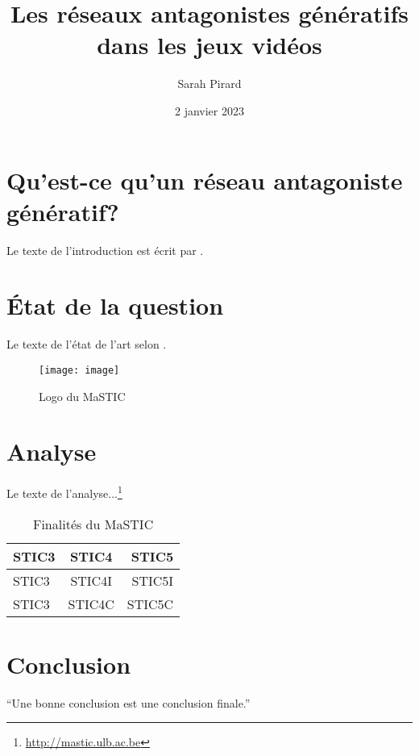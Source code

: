 \documentclass[a4paper,11pt]{article} %
\title{Les réseaux antagonistes génératifs dans les jeux vidéos} %
\author{Sarah Pirard} %
\date{2 janvier 2023} %
\begin{document}
\maketitle %

\section{Qu'est-ce qu'un réseau antagoniste génératif?} %
Le texte de l'introduction est écrit par \citet{Boy99}. %

\section{État de la question} %
Le texte de l'état de l'art selon \citet[p. 123]{Boy11}. %

\begin{figure}[h] %
  \centering %
  \texttt{[image: image]} %
  \caption{Logo du MaSTIC} %
\end{figure}

\section{Analyse} %
Le texte de l'analyse...\footnote{\url{http://mastic.ulb.ac.be}}

\begin{table}[h] %
  \centering %
  \begin{tabular}{|l|c|r|} %
    \hline %
    STIC3 & STIC4 & STIC5 \\ %
    \hline
    STIC3 & STIC4I & STIC5I \\
    STIC3 & STIC4C & STIC5C \\
    \hline
  \end{tabular}
  \caption{Finalités du MaSTIC}
\end{table}

\section{Conclusion} %
\enquote{Une bonne conclusion est une conclusion finale.} \citep{Hoo12} %

\end{document}
